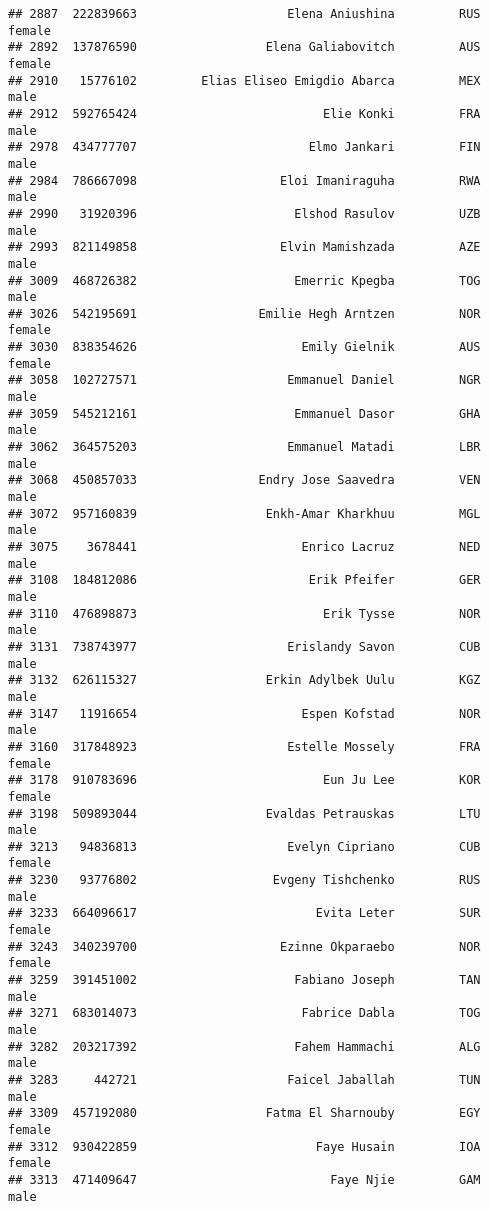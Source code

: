 \documentclass[]{article}
\begin{document}
\begin{verbatim}
## 2887  222839663                     Elena Aniushina         RUS female
## 2892  137876590                  Elena Galiabovitch         AUS female
## 2910   15776102         Elias Eliseo Emigdio Abarca         MEX   male
## 2912  592765424                          Elie Konki         FRA   male
## 2978  434777707                        Elmo Jankari         FIN   male
## 2984  786667098                    Eloi Imaniraguha         RWA   male
## 2990   31920396                      Elshod Rasulov         UZB   male
## 2993  821149858                    Elvin Mamishzada         AZE   male
## 3009  468726382                      Emerric Kpegba         TOG   male
## 3026  542195691                 Emilie Hegh Arntzen         NOR female
## 3030  838354626                       Emily Gielnik         AUS female
## 3058  102727571                     Emmanuel Daniel         NGR   male
## 3059  545212161                      Emmanuel Dasor         GHA   male
## 3062  364575203                     Emmanuel Matadi         LBR   male
## 3068  450857033                 Endry Jose Saavedra         VEN   male
## 3072  957160839                  Enkh-Amar Kharkhuu         MGL   male
## 3075    3678441                       Enrico Lacruz         NED   male
## 3108  184812086                        Erik Pfeifer         GER   male
## 3110  476898873                          Erik Tysse         NOR   male
## 3131  738743977                     Erislandy Savon         CUB   male
## 3132  626115327                  Erkin Adylbek Uulu         KGZ   male
## 3147   11916654                       Espen Kofstad         NOR   male
## 3160  317848923                     Estelle Mossely         FRA female
## 3178  910783696                          Eun Ju Lee         KOR female
## 3198  509893044                  Evaldas Petrauskas         LTU   male
## 3213   94836813                     Evelyn Cipriano         CUB female
## 3230   93776802                   Evgeny Tishchenko         RUS   male
## 3233  664096617                         Evita Leter         SUR female
## 3243  340239700                    Ezinne Okparaebo         NOR female
## 3259  391451002                      Fabiano Joseph         TAN   male
## 3271  683014073                       Fabrice Dabla         TOG   male
## 3282  203217392                      Fahem Hammachi         ALG   male
## 3283     442721                     Faicel Jaballah         TUN   male
## 3309  457192080                  Fatma El Sharnouby         EGY female
## 3312  930422859                         Faye Husain         IOA female
## 3313  471409647                           Faye Njie         GAM   male

\end{verbatim}
\end{document}
